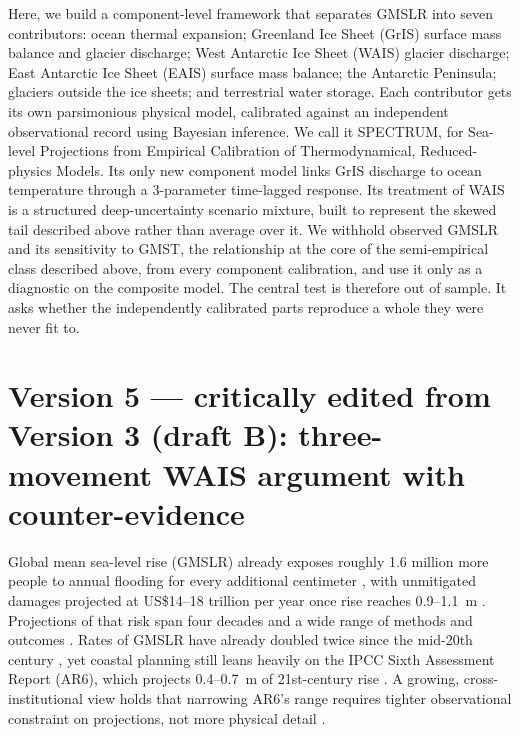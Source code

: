 \documentclass[12pt]{article}
\begin{document}
Here, we build a component-level framework that separates GMSLR into
seven contributors: ocean thermal expansion; Greenland Ice Sheet (GrIS)
surface mass balance and glacier discharge; West Antarctic Ice Sheet
(WAIS) glacier discharge; East Antarctic Ice Sheet (EAIS) surface mass
balance; the Antarctic Peninsula; glaciers outside the ice sheets; and
terrestrial water storage. Each contributor gets its own parsimonious
physical model, calibrated against an independent observational record
using Bayesian inference. We call it SPECTRUM, for Sea-level
Projections from Empirical Calibration of Thermodynamical,
Reduced-physics Models. Its only new component model links GrIS
discharge to ocean temperature through a 3-parameter time-lagged
response. Its treatment of WAIS is a structured deep-uncertainty
scenario mixture, built to represent the skewed tail described above
rather than average over it. We withhold observed GMSLR and its
sensitivity to GMST, the relationship at the core of the semi-empirical
class described above, from every component calibration, and use it
only as a diagnostic on the composite model. The central test is
therefore out of sample. It asks whether the independently calibrated
parts reproduce a whole they were never fit to.

\section*{Version 5 --- critically edited from Version 3 (draft B): three-movement WAIS argument with counter-evidence}

Global mean sea-level rise (GMSLR) already exposes roughly 1.6
million more people to annual flooding for every additional centimeter
\citep{Kulp2019}, with unmitigated damages projected at US\$14--18
trillion per year once rise reaches 0.9--1.1~m \citep{Jevrejeva2018}.
Projections of that risk span four decades and a wide range of methods
and outcomes \citep{Garner2026}. Rates of GMSLR have already doubled
twice since the mid-20th century \citep{Frederikse2020,Hamlington2024},
yet coastal planning still leans heavily on the IPCC Sixth Assessment
Report (AR6), which projects 0.4--0.7~m of 21st-century rise
\citep{Fox-Kemper2021,Hirschfeld2023}. A growing, cross-institutional
view holds that narrowing AR6's range requires tighter observational
constraint on projections, not more physical detail \citep{Felikson2025}.
\end{document}
